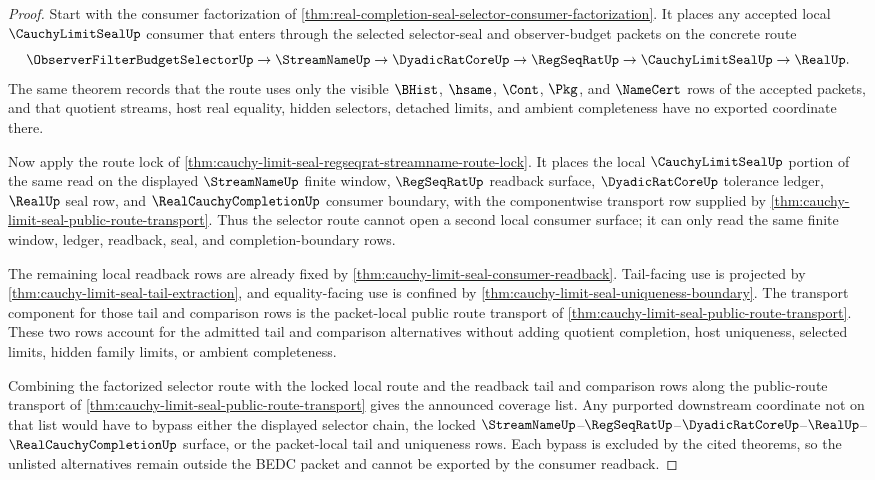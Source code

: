 \begin{proof}
Start with the consumer factorization of \autoref{thm:real-completion-seal-selector-consumer-factorization}. It places any accepted local $\CauchyLimitSealUp$ consumer that enters through the selected selector-seal and observer-budget packets on the concrete route
$$
\ObserverFilterBudgetSelectorUp \to \StreamNameUp \to \DyadicRatCoreUp \to \RegSeqRatUp \to \CauchyLimitSealUp \to \RealUp.
$$
The same theorem records that the route uses only the visible $\BHist$, $\hsame$, $\Cont$, $\Pkg$, and $\NameCert$ rows of the accepted packets, and that quotient streams, host real equality, hidden selectors, detached limits, and ambient completeness have no exported coordinate there.

Now apply the route lock of \autoref{thm:cauchy-limit-seal-regseqrat-streamname-route-lock}. It places the local $\CauchyLimitSealUp$ portion of the same read on the displayed $\StreamNameUp$ finite window, $\RegSeqRatUp$ readback surface, $\DyadicRatCoreUp$ tolerance ledger, $\RealUp$ seal row, and $\RealCauchyCompletionUp$ consumer boundary, with the componentwise transport row supplied by \autoref{thm:cauchy-limit-seal-public-route-transport}. Thus the selector route cannot open a second local consumer surface; it can only read the same finite window, ledger, readback, seal, and completion-boundary rows.

The remaining local readback rows are already fixed by \autoref{thm:cauchy-limit-seal-consumer-readback}. Tail-facing use is projected by \autoref{thm:cauchy-limit-seal-tail-extraction}, and equality-facing use is confined by \autoref{thm:cauchy-limit-seal-uniqueness-boundary}. The transport component for those tail and comparison rows is the packet-local public route transport of \autoref{thm:cauchy-limit-seal-public-route-transport}. These two rows account for the admitted tail and comparison alternatives without adding quotient completion, host uniqueness, selected limits, hidden family limits, or ambient completeness.

Combining the factorized selector route with the locked local route and the readback tail and comparison rows along the public-route transport of \autoref{thm:cauchy-limit-seal-public-route-transport} gives the announced coverage list. Any purported downstream coordinate not on that list would have to bypass either the displayed selector chain, the locked $\StreamNameUp$--$\RegSeqRatUp$--$\DyadicRatCoreUp$--$\RealUp$--$\RealCauchyCompletionUp$ surface, or the packet-local tail and uniqueness rows. Each bypass is excluded by the cited theorems, so the unlisted alternatives remain outside the BEDC packet and cannot be exported by the consumer readback.
\end{proof}
